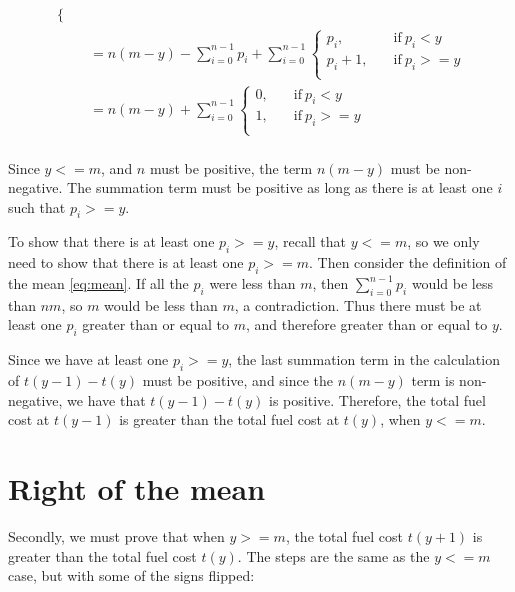 \documentclass{article}
\begin{document}
\begin{equation*}
\begin{split}
\begin{cases}
    \end{cases} \\
    &= n(m-y) -\sum_{i=0}^{n-1} p_i + \sum_{i=0}^{n-1}
    \begin{cases}
      p_i, & \quad\text{if}\ p_i < y \\
      p_i + 1, & \quad\text{if}\ p_i >= y \\
    \end{cases} \\
    &= n(m-y) + \sum_{i=0}^{n-1}
    \begin{cases}
      0, & \quad\text{if}\ p_i < y \\
      1, & \quad\text{if}\ p_i >= y \\
    \end{cases} \\
  \end{split}
\end{equation*}

Since $y<=m$, and $n$ must be positive, the term $n(m-y)$ must be
non-negative. The summation term must be positive as long as there
is at least one $i$ such that $p_i >= y$.

To show that there is at least one $p_i >= y$, recall that $y <= m$,
so we only need to show that there is at least one $p_i >= m$.
Then consider the definition of the mean \eqref{eq:mean}. If all
the $p_i$ were less than $m$, then $\sum_{i=0}^{n-1} p_i$ would be
less than $nm$, so $m$ would be less than $m$, a contradiction.
Thus there must be at least one $p_i$ greater than or equal to $m$,
and therefore greater than or equal to $y$.

Since we have at least one $p_i >= y$, the last summation term
in the calculation of $t(y-1) - t(y)$ must be positive, and since
the $n(m-y)$ term is non-negative, we have that $t(y-1) - t(y)$ is
positive. Therefore, the total fuel cost at $t(y-1)$ is greater than
the total fuel cost at $t(y)$, when $y <= m$.

\section{Right of the mean}

Secondly, we must prove that when $y >= m$, the total fuel cost
$t(y+1)$ is greater than the total fuel cost $t(y)$. The steps
are the same as the $y <= m$ case, but with some of the signs flipped:
\end{document}
